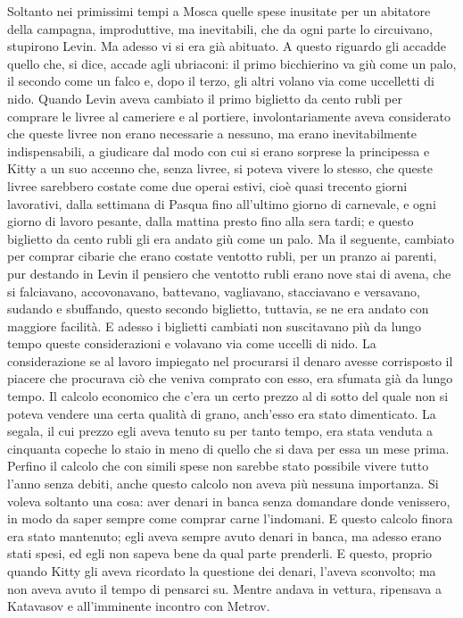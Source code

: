 Soltanto nei primissimi tempi a Mosca quelle spese inusitate per un abitatore della campagna, improduttive, ma inevitabili, che da ogni parte lo circuivano, stupirono Levin. Ma adesso vi si era già abituato. A questo riguardo gli accadde quello che, si dice, accade agli ubriaconi: il primo bicchierino va giù come un palo, il secondo come un falco e, dopo il terzo, gli altri volano via come uccelletti di nido. Quando Levin aveva cambiato il primo biglietto da cento rubli per comprare le livree al cameriere e al portiere, involontariamente aveva considerato che queste livree non erano necessarie a nessuno, ma erano inevitabilmente indispensabili, a giudicare dal modo con cui si erano sorprese la principessa e Kitty a un suo accenno che, senza livree, si poteva vivere lo stesso, che queste livree sarebbero costate come due operai estivi, cioè quasi trecento giorni lavorativi, dalla settimana di Pasqua fino all'ultimo giorno di carnevale, e ogni giorno di lavoro pesante, dalla mattina presto fino alla sera tardi; e questo biglietto da cento rubli gli era andato giù come un palo. Ma il seguente, cambiato per comprar cibarie che erano costate ventotto rubli, per un pranzo ai parenti, pur destando in Levin il pensiero che ventotto rubli erano nove stai di avena, che si falciavano, accovonavano, battevano, vagliavano, stacciavano e versavano, sudando e sbuffando, questo secondo biglietto, tuttavia, se ne era andato con maggiore facilità. E adesso i biglietti cambiati non suscitavano più da lungo tempo queste considerazioni e volavano via come uccelli di nido. La considerazione se al lavoro impiegato nel procurarsi il denaro avesse corrisposto il piacere che procurava ciò che veniva comprato con esso, era sfumata già da lungo tempo. Il calcolo economico che c'era un certo prezzo al di sotto del quale non si poteva vendere una certa qualità di grano, anch'esso era stato dimenticato. La segala, il cui prezzo egli aveva tenuto su per tanto tempo, era stata venduta a cinquanta copeche lo staio in meno di quello che si dava per essa un mese prima. Perfino il calcolo che con simili spese non sarebbe stato possibile vivere tutto l'anno senza debiti, anche questo calcolo non aveva più nessuna importanza. Si voleva soltanto una cosa: aver denari in banca senza domandare donde venissero, in modo da saper sempre come comprar carne l'indomani. E questo calcolo finora era stato mantenuto; egli aveva sempre avuto denari in banca, ma adesso erano stati spesi, ed egli non sapeva bene da qual parte prenderli. E questo, proprio quando Kitty gli aveva ricordato la questione dei denari, l'aveva sconvolto; ma non aveva avuto il tempo di pensarci su. Mentre andava in vettura, ripensava a Katavasov e all'imminente incontro con Metrov. 


